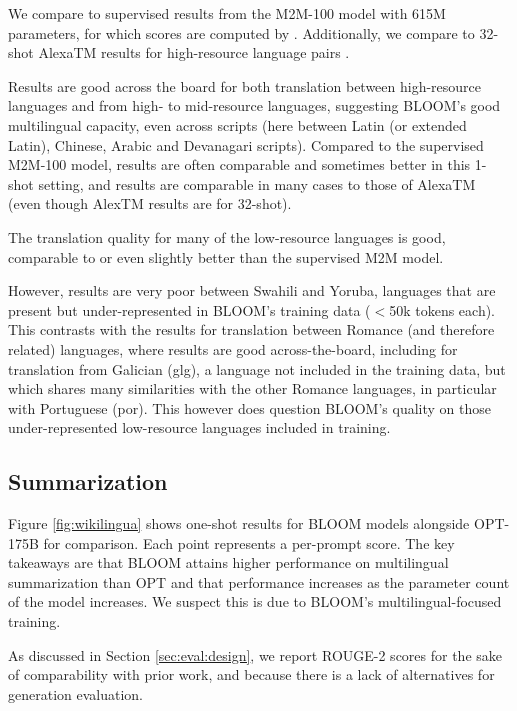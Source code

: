 We compare to supervised results from the M2M-100 model \citep{fan-etal-2021-beyond} with 615M parameters, for which scores are computed by \cite{goyal-etal-2022-flores}. Additionally, we compare to 32-shot AlexaTM results for high-resource language pairs \citep{soltan-etal-2022-alexatm}. 

Results are good across the board for both translation between high-resource languages and from high- to mid-resource languages, suggesting BLOOM's good multilingual capacity, even across scripts (here between Latin (or extended Latin), Chinese, Arabic and Devanagari scripts). Compared to the supervised M2M-100 model, results are often comparable and sometimes better in this 1-shot setting, and results are comparable in many cases to those of AlexaTM (even though AlexTM results are for 32-shot).

The translation quality for many of the low-resource languages is good, comparable to or even slightly better than the supervised M2M model.

However, results are very poor between Swahili and Yoruba, languages that are present but under-represented in BLOOM's training data ($<$50k tokens each). This contrasts with the results for translation between Romance (and therefore related) languages, where results are good across-the-board, including for translation from Galician (glg), a language not included in the training data, but which shares many similarities with the other Romance languages, in particular with Portuguese (por). This however does question BLOOM's quality on those under-represented low-resource languages included in training.

\subsection{Summarization}
\label{sec:eval:wikilingua}

Figure \ref{fig:wikilingua} shows one-shot results for BLOOM models alongside OPT-175B for comparison. Each point represents a per-prompt score. The key takeaways are that BLOOM attains higher performance on multilingual summarization than OPT and that performance increases as the parameter count of the model increases. We suspect this is due to BLOOM's multilingual-focused training.

As discussed in Section \ref{sec:eval:design}, we report ROUGE-2 scores for the sake of comparability with prior work, and because there is a lack of alternatives for generation evaluation. 

